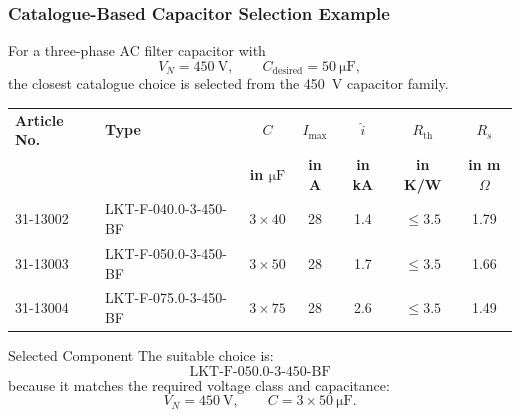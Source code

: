 \begin{frame}
\frametitle{Catalogue-Based Capacitor Selection Example}
\small
For a three-phase AC filter capacitor with
\[
V_N = 450~\si{\volt},
\qquad
C_{\mathrm{desired}} = 50~\si{\micro\farad},
\]
the closest catalogue choice is selected from the 450~V capacitor family.

\begin{table}
\centering
\scriptsize
\renewcommand{\arraystretch}{1.15}
\begin{tabular}{p{}p{}c c c c c}
\hline
\textbf{Article No.} & \textbf{Type} & 
\textbf{$C$} & 
\textbf{$I_{\max}$} & 
\textbf{$\hat{i}$} & 
\textbf{$R_{\mathrm{th}}$} & 
\textbf{$R_s$} \\
 & & 
\textbf{in $\si{\micro\farad}$} & 
\textbf{in A} & 
\textbf{in kA} & 
\textbf{in K/W} & 
\textbf{in m$\Omega$} \\
\hline
31-13002 & LKT-F-040.0-3-450-BF & $3\times40$ & 28 & 1.4 & $\leq 3.5$ & 1.79 \\

\rowcolor{green!15}
31-13003 & LKT-F-050.0-3-450-BF & $3\times50$ & 28 & 1.7 & $\leq 3.5$ & 1.66 \\

31-13004 & LKT-F-075.0-3-450-BF & $3\times75$ & 28 & 2.6 & $\leq 3.5$ & 1.49 \\
\hline
\end{tabular}
\end{table}

\vspace{0.1cm}

\begin{block}{Selected Component}
\small
The suitable choice is:
\[
\boxed{\text{LKT-F-050.0-3-450-BF}}
\]
because it matches the required voltage class and capacitance:
\[
V_N = 450~\si{\volt},
\qquad
C = 3\times50~\si{\micro\farad}.
\]
\end{block}
\end{frame}



